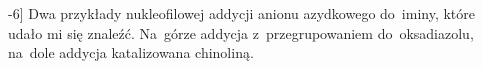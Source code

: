 \begin{scheme*}
  
  \caption[][-6\baselineskip]{
    Dwa przykłady nukleofilowej addycji anionu azydkowego do~iminy, które udało mi się znaleźć.
    Na~górze addycja z~przegrupowaniem do~oksadiazolu, na~dole addycja katalizowana chinoliną.
  }
  \label{sch:azide-nucleophile}
\end{scheme*}

       